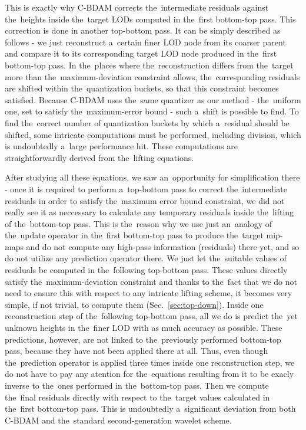 This is exactly why C-BDAM corrects the~intermediate residuals against the~heights inside the~target LODs computed in the~first bottom-top pass. This correction is done in another top-bottom pass. It can be simply described as follows - we just reconstruct a~certain finer LOD node from its coarser parent and compare it to its corresponding target LOD node produced in the~first bottom-top pass. In the~places where the~reconstruction differs from the~target more than the~maximum-deviation constraint allows, the~corresponding residuals are shifted within the~quantization buckets, so that this constraint becomes satisfied. Because C-BDAM uses the~same quantizer as our method - the~uniform one, set to satisfy the~maximum-error bound - such a~shift is possible to find. To find the~correct number of quantization buckets by which a~residual should be shifted, some intricate computations must be performed, including division, which is undoubtedly a~large performance hit. These computations are straightforwardly derived from the~lifting equations.

After studying all these equations, we saw an~opportunity for simplification there - once it is required to perform a~top-bottom pass to correct the~intermediate residuals in order to satisfy the~maximum error bound constraint, we did not really see it as neccessary to calculate any temporary residuals inside the~lifting of the~bottom-top pass. This is the~reason why we use just an~analogy of the~update operator in the~first bottom-top pass to produce the~target mip-maps and do not compute any high-pass information (residuals) there yet, and so do not utilize any prediction operator there. We just let the~suitable values of residuals be computed in the~following top-bottom pass. These values directly satisfy the~maximum-deviation constraint and thanks to the~fact that we do not need to ensure this with respect to any intricate lifting scheme, it becomes very simple, if not trivial, to compute them (Sec.~\ref{sec:top-down}). Inside one reconstruction step of the~following top-bottom pass, all we do is predict the~yet unknown heights in the~finer LOD with as much accuracy as possible. These predictions, however, are not linked to the~previously performed bottom-top pass, because they have not been applied there at all. Thus, even though the~prediction operator is applied three times inside one reconstruction step, we do not have to pay any atention for the~equations resulting from it to be exacly inverse to the~ones performed in the~bottom-top pass. Then we compute the~final residuals directly with respect to the~target values calculated in the~first bottom-top pass. This is undoubtedly a~significant deviation from both C-BDAM and the~standard second-generation wavelet scheme. 

